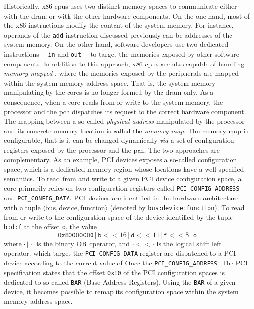 Historically, x86 \acp{cpu} uses two distinct memory spaces to communicate
either with the \ac{dram} or with the other hardware components.
%
On the one hand, most of the x86 instructions modify the content of the system
memory.
%
For instance, operands of the \texttt{add} instruction discussed previously can
be addresses of the system memory.
%
On the other hand, software developers use two dedicated instructions
---\texttt{in} and \texttt{out}--- to target the memories exposed by other
software components.
%
In addition to this approach, x86 \acp{cpu} are also capable of handling
\emph{memory-mapped} \IOs, where the memories exposed by the peripherals are
mapped within the system memory address space.
%
That is, the system memory manipulating by the cores is no longer formed by the
\ac{dram} only.
%
As a consequence, when a core reads from or write to the system memory, the
processor and the \ac{pch} dispatches its request to the correct hardware
component.
%
The mapping between a so-called \emph{physical address} manipulated by the
processor and its concrete memory location is called the \emph{memory map}.
%
The memory map is configurable, that is it can be changed dynamically \emph{via}
a set of configuration registers exposed by the processor and the \ac{pch}.
%
The two approaches are complementary.
%
As an example, PCI devices exposes a so-called configuration space, which is a
dedicated memory region whose locations have a well-specified
semantics.
%
To read from and write to a given PCI device configuration space, a core
primarily relies on two configuration registers called
\texttt{PCI\_CONFIG\_ADDRESS} and \texttt{PCI\_CONFIG\_DATA}.
%
PCI devices are identified in the hardware architecture with a tuple
\( \langle \mathrm{bus}, \mathrm{device}, \mathrm{function} \rangle \) (denoted
by \texttt{bus:device:function}).
%
To read from or write to the configuration space of the device identified by the
tuple \texttt{b:d:f} at the offset \texttt{o}, the value
\[
  \mathtt{0x80000000}\,|\,\texttt{b} <\!\!< 16\,|\,\texttt{d} <\!\!<
  11\,|\,\texttt{f} <\!\!< 8\,|\,\texttt{o}
\]
%
where \(\cdot\,|\,\cdot\) is the binary OR operator, and \(\cdot <\!\!< \cdot\)
is the logical shift left operator.
%
\IOs which target the \texttt{PCI\_CONFIG\_DATA} register are dispatched to a
PCI device according to the current value of Once the
\texttt{PCI\_CONFIG\_ADDRESS}.
%
The PCI specification states that the offset \texttt{0x10} of the PCI
configuration spaces is dedicated to so-called \texttt{BAR} (Base Address
Registers).
%
Using the \texttt{BAR} of a given device, it becomes possible to remap its
configuration space within the system memory address space.

